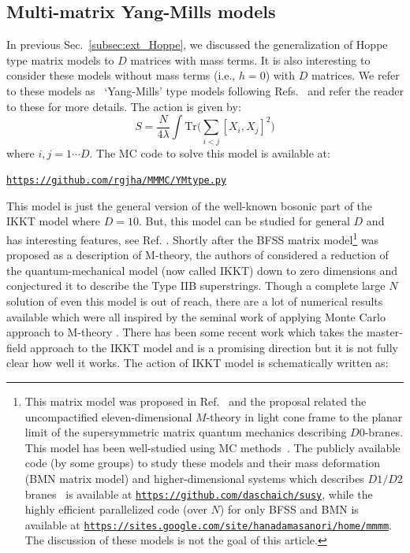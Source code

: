 \documentclass[letter,11pt]{article}
\begin{document}
\subsection{Multi-matrix Yang-Mills models}
In previous Sec.~\ref{subsec:ext_Hoppe}, we discussed the generalization of Hoppe type matrix models to $D$ matrices with mass terms. It is also interesting to consider these models without mass terms (i.e., $h=0$) with $D$ matrices. We refer to these models as ~`Yang-Mills' type models following Refs.~\cite{Krauth:1998yu,Krauth:1999qw} and refer the reader to these for more details. The action is given by: 
\begin{equation}
	\label{eq:CTmodel} 
S = \frac{N}{4\lambda} \int \mbox{Tr} \Bigg( \sum_{i < j}[X_i, X_j]^{2}\Bigg) 
\end{equation}
where $i, j = 1 \cdots D$. The MC code to solve this model is available at:
\begin{center} \texttt{\href{https://github.com/rgjha/MMMC/blob/main/YMtype.py}{https://github.com/rgjha/MMMC/YMtype.py}} \end{center}
This model is just the general version of the well-known bosonic part of the IKKT model where $D=10$. But, this model can be studied for general $D$ and has interesting features, see Ref. \cite{Hotta:1998en}. 
Shortly after the BFSS matrix model\footnote{This matrix model was proposed in Ref.~\cite{Banks:1996vh} and the proposal related the uncompactified eleven-dimensional $M$-theory in light cone frame to the planar limit of the supersymmetric matrix quantum mechanics describing $D0$-branes. This model has been well-studied using MC methods~\cite{Catterall:2007fp,Hanada:2008ez,Filev:2015hia,Berkowitz:2016tyy}. 
The publicly available code (by some groups) to study these models and their mass deformation (BMN matrix model) and higher-dimensional systems which describes $D1/D2$ branes~\cite{Catterall:2017lub,Jha:2017zad,Catterall:2020nmn}
is available at \texttt{\href{https://github.com/daschaich/susy}{https://github.com/daschaich/susy}}, while the
highly efficient parallelized code (over $N$) for only BFSS and BMN is available at
\texttt{\href{https://sites.google.com/site/hanadamasanori/home/mmmm}
{https://sites.google.com/site/hanadamasanori/home/mmmm}}.
The discussion of these models is not the goal of this article. 
}
was proposed as a description of M-theory, the authors of 
\cite{Ishibashi:1996xs} considered a reduction of the quantum-mechanical model (now called IKKT) down to zero 
dimensions and conjectured it to describe the Type IIB superstrings. Though a complete large $N$ solution of even this model is out of reach, there are a lot of numerical results available which were all inspired by the seminal work of applying Monte Carlo approach to M-theory \cite{Krauth:1998xh}. There has been some recent work which takes the master-field approach to the IKKT model \cite{Klinkhamer:2021wrv} and is a promising direction but it is not fully clear how well it works. The action of IKKT model is schematically written as:
\end{document}
